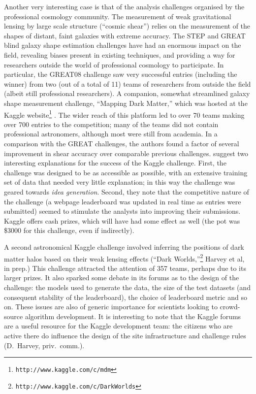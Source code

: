 \documentclass{ar2e}
\begin{document}
Another very interesting case is that of the analysis challenges organised by
the professional cosmology community.  The measurement of weak gravitational
lensing by large scale structure (``cosmic shear'') relies on the measurement
of the shapes of distant, faint galaxies with extreme accuracy. The STEP
\citep{HeymansEtal2006,MasseyEtal2007} and GREAT
\citep{BridleEtal2010,KitchingEtal2012,KitchingEtal2013a} blind galaxy shape
estimation challenges have had an enormous impact on the field, revealing
biases present in existing techniques, and providing a way for researchers
outside the world of professional cosmology to participate. In particular, the
GREAT08 challenge saw very successful entries (including the winner) from two
(out of a total of 11) teams of researchers from outside the field (albeit
still professional researchers). A companion, somewhat streamlined galaxy
shape measurement challenge, ``Mapping Dark Matter,'' which was hosted at the
Kaggle website\footnote{\texttt{http://www.kaggle.com/c/mdm}} 
\citep{KitchingEtal2013b}. The wider reach of this platform led to over 70
teams making over 700 entries to the competition; many of the teams did not
contain professional astronomers, although most were still from academia.
In a comparison with the
GREAT challenges, the authors found a factor of several improvement in shear
accuracy over comparable previous challenges. \citet{KitchingEtal2013b}
suggest two interesting explanations for the success of the Kaggle challenge.
First, the challenge was designed to be as accessible as possible, with an
extensive training set of data that needed very little explanation; in this
way the challenge was geared towards {\it idea generation}. Second, they note
that the competitive  nature of the challenge (a webpage leaderboard was
updated in real time as entries were submitted) seemed to stimulate the
analysts into improving their submissions. Kaggle offers cash prizes, which
will have had some effect as well (the pot
was \$3000 for this challenge, even if indirectly).

A second astronomical Kaggle challenge involved inferring the positions of
dark matter halos based on their weak lensing effects (``Dark
Worlds,''\footnote{\texttt{http://www.kaggle.com/c/DarkWorlds}} Harvey et al,
in prep.) This challenge attracted the attention of 357 teams, perhaps due to
its larger prizes. It also sparked some debate in its forums as to the design
of the challenge: the models used to generate the data, the size of the test
datasets (and consequent stability of the leaderboard),  the choice of
leaderboard metric and so on. These issues are also of generic importance for
scientists looking to crowd-source algorithm development. It is interesting to
note that the Kaggle forums are a useful resource for the Kaggle development
team: the citizens who are active there do influence the design of the site
infrastructure and challenge rules (D.~Harvey, priv.~comm.).
\end{document}
